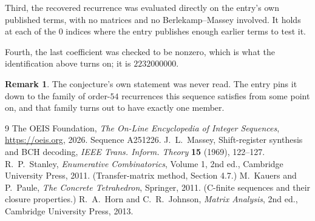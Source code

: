 \documentclass[11pt,a4paper]{article}
\theoremstyle{plain}
\theoremstyle{definition}
\newtheorem{remark}[theorem]{Remark}
\begin{document}
Third, the recovered recurrence was evaluated directly on the entry's own published terms, with
no matrices and no Berlekamp--Massey involved. It holds at each of the $0$ indices where
the entry publishes enough earlier terms to test it.

Fourth, the last coefficient was checked to be nonzero, which is what the identification above
turns on; it is $2232000000$.

\begin{remark}
The conjecture's own statement was never read. The entry pins it down to the family of
order-$54$ recurrences this sequence satisfies from some point on, and that family turns
out to have exactly one member.
\end{remark}

\begin{thebibliography}{9}
 The OEIS Foundation, \emph{The On-Line Encyclopedia of Integer
Sequences}, \url{https://oeis.org}, 2026. Sequence A251226.
 J.~L.~Massey, Shift-register synthesis and BCH decoding, \emph{IEEE
Trans. Inform. Theory} \textbf{15} (1969), 122--127.
 R.~P.~Stanley, \emph{Enumerative Combinatorics}, Volume 1, 2nd ed.,
Cambridge University Press, 2011. (Transfer-matrix method, Section 4.7.)
 M.~Kauers and P.~Paule, \emph{The Concrete Tetrahedron}, Springer, 2011.
(C-finite sequences and their closure properties.)
 R.~A.~Horn and C.~R.~Johnson, \emph{Matrix Analysis}, 2nd ed., Cambridge
University Press, 2013.
\end{thebibliography}
\end{document}
